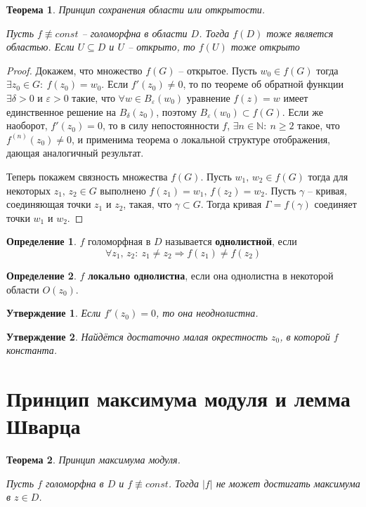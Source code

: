 \documentclass[a4paper,12pt]{article}
\renewcommand{\geq}{\ensuremath{\geqslant}}
\theoremstyle{plain}
\newtheorem{theorem}{Теорема}[section]
\newtheorem{proposition}{Утверждение}[section]
\theoremstyle{definition}
\newtheorem{definition}{Определение}[section]
\theoremstyle{remark}
\begin{document}
\begin{theorem}
	Принцип сохранения области или открытости.

	Пусть $f \not\equiv const$ -- голоморфна в области $D$. Тогда $f(D)$ тоже является областью. Если $U \subseteq D $ и $U$ -- открыто, то $f(U)$ тоже открыто
\end{theorem}

\begin{proof}
	Докажем, что множество $f(G)$ -- открытое. Пусть $w_0 \in f(G)$ тогда $\exists z_0 \in G :\: f(z_0) = w_0$. Если $f'(z_0) \neq 0$, то по теореме об обратной функции $\exists \delta > 0$ и $\varepsilon > 0$ такие, что $\forall w \in B_\varepsilon(w_0)$ уравнение $f(z) = w$ имеет единственное решение на $B_\delta(z_0)$, поэтому $B_\varepsilon(w_0) \subset f(G)$. Если же наоборот, $f'(z_0) = 0$, то в силу непостоянности $f$, $\exists n \in \mathbb{N} :\: n \geq 2$ такое, что $f^{(n)}(z_0) \neq 0$, и применима теорема о локальной структуре отображения, дающая аналогичный результат.

	Теперь покажем связность множества $f(G)$. Пусть $w_1,\,w_2 \in f(G)$ тогда для некоторых $z_1,\,z_2 \in G$ выполнено $f(z_1) = w_1,\, f(z_2) = w_2$. Пусть $\gamma$ -- кривая, соединяющая точки $z_1$ и $z_2$, такая, что $\gamma \subset G$. Тогда кривая $\Gamma = f(\gamma)$ соединяет точки $w_1$ и $w_2$.
\end{proof}

\begin{definition}
	$f$ голоморфная в $D$ называется \textbf{однолистной}, если
	\[
		\forall z_1,\,z_2 :\: z_1 \neq z_2 \Rightarrow f(z_1) \neq f(z_2)
	\]
\end{definition}

\begin{definition}
	$f$ \textbf{локально однолистна}, если она однолистна в некоторой области $O(z_0)$.
\end{definition}

\begin{proposition}
	Если $f'(z_0) = 0$, то она неоднолистна.
\end{proposition}

\begin{proposition}
	Найдётся достаточно малая окрестность $z_0$, в которой $f$ константа.
\end{proposition}

\section{Принцип максимума модуля и лемма Шварца}
\begin{theorem}
	Принцип максимума модуля.

	Пусть $f$ голоморфна в $D$ и $f \not\equiv const$. Тогда $\vert f\vert$ не может достигать максимума в $z \in D$.
\end{theorem}
\end{document}
